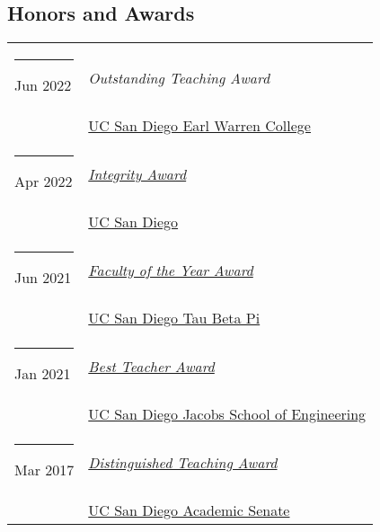 \documentclass[margin,line]{res}
\begin{document}
\begin{resume}
\section{\sc Honors and Awards}
\begin{longtable}{@{}p{0.7in}p{4in}}
\hspace*{-4mm} \rule{-1mm}{5mm} Jun 2022 & \textit{Outstanding Teaching Award}\\*
\hspace*{-4mm} \hspace*{-4mm} & \hspace{4mm} \href{https://warren.ucsd.edu/}{UC San Diego Earl Warren College}\\
\hspace*{-4mm} \rule{-1mm}{5mm} Apr 2022 & \href{https://academicintegrity.ucsd.edu/events/integrity-awards/index.html}{\textit{Integrity Award}}\\*
\hspace*{-4mm} \hspace*{-4mm} & \hspace{4mm} \href{https://www.ucsd.edu/}{UC San Diego}\\
\hspace*{-4mm} \rule{-1mm}{5mm} Jun 2021 & \href{https://tbp.ucsd.edu/home}{\textit{Faculty of the Year Award}}\\*
\hspace*{-4mm} \hspace*{-4mm} & \hspace{4mm} \href{https://tbp.ucsd.edu/home}{UC San Diego Tau Beta Pi}\\
\hspace*{-4mm} \rule{-1mm}{5mm} Jan 2021 & \href{https://jacobsschool.ucsd.edu/faculty/best-teacher-awards}{\textit{Best Teacher Award}}\\*
\hspace*{-4mm} \hspace*{-4mm} & \hspace{4mm} \href{https://jacobsschool.ucsd.edu/}{UC San Diego Jacobs School of Engineering}\\
\hspace*{-4mm} \rule{-1mm}{5mm} Mar 2017 & \href{https://senate.ucsd.edu/Grants-Awards/Senate-Awards/distinguished-teaching}{\textit{Distinguished Teaching Award}}\\*
\hspace*{-4mm} \hspace*{-4mm} & \hspace{4mm} \href{https://senate.ucsd.edu/}{UC San Diego Academic Senate}\\

\end{longtable}
\end{resume}
\end{document}
